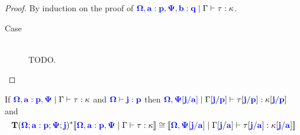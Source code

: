 \documentclass[sigplan,10pt,review,anonymous]{acmart}
\newcommand{\blu}[1]{\textbf{\color{blue}{#1}}}
\newcommand{\blum}[1]{\mathbf{\color{blue}{#1}}}
\newcommand{\sem}[1]{\llbracket #1 \rrbracket}
\newcommand{\mbf}[1]{\mathbf{#1}}
\begin{document}
\begin{proof}
By induction on the proof of $\blum{\Omega,a:p,\Psi,b:q} \mid \Gamma \vdash \tau : \kappa$.
\begin{description}
\item[Case \begin{sc}K-IndAbs\end{sc}:]~\\
TODO.
\end{description}
\end{proof}

\begin{lemma}
If $\blum{\Omega,a : p, \Psi} \mid \Gamma \vdash \tau : \kappa$ and $\blum{\Omega \vdash j : p}$ then $\blum{\Omega, \Psi[j/a]} \mid \Gamma[\blum{j}/\blum{p}] \vdash \tau[\blum{j}/\blum{p}] : \kappa[\blum{j}/\blum{p}]$ and
$$\mbf{T}(\blum{\Omega} ; \blum{a : p} ; \blum{\Psi} ; \blu{j})^* \sem{\blum{\Omega, a:p, \Psi} \mid \Gamma \vdash \tau : \kappa} \cong \sem{\blum{\Omega, \Psi[j/a]} \mid \Gamma[\blum{j}/\blum{a}] \vdash \tau[\blum{j}/\blum{a}] : \kappa[\blum{j}/\blum{a}]}$$
\end{lemma}
\end{document}
